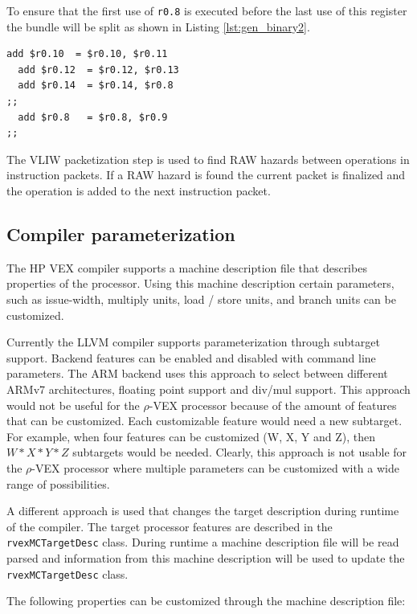 To ensure that the first use of \texttt{r0.8} is executed before the last use of this register the bundle will be split as shown in Listing \ref{lst:gen_binary2}.

\pagebreak

\begin{lstlisting}[language=rvex, label=lst:gen_binary2, caption={Generic $\rho$-VEX binary.}]
  add $r0.10  = $r0.10, $r0.11
  add $r0.12  = $r0.12, $r0.13
  add $r0.14  = $r0.14, $r0.8
;;
  add $r0.8   = $r0.8, $r0.9
;; 
\end{lstlisting}

The VLIW packetization step is used to find RAW hazards between operations in instruction packets. If a RAW hazard is found the current packet is finalized and the operation is added to the next instruction packet.

\subsection{Compiler parameterization}
The HP VEX compiler supports a machine description file that describes properties of the processor. Using this machine description certain parameters, such as issue-width, multiply units, load / store units, and branch units can be customized. 

Currently the LLVM compiler supports parameterization through subtarget support. Backend features can be enabled and disabled with command line parameters. The ARM backend uses this approach to select between different ARMv7 architectures, floating point support and div/mul support. This approach would not be useful for the $\rho$-VEX processor because of the amount of features that can be customized. Each customizable feature would need a new subtarget. For example, when four features can be customized (W, X, Y and Z), then $W*X*Y*Z$ subtargets would be needed. Clearly, this approach is not usable for the $\rho$-VEX processor where multiple parameters can be customized with a wide range of possibilities.

A different approach is used that changes the target description during runtime of the compiler. The target processor features are described in the \texttt{rvexMCTargetDesc} class. During runtime a machine description file will be read parsed and information from this machine description will be used to update the \texttt{rvexMCTargetDesc} class. 

The following properties can be customized through the machine description file:

